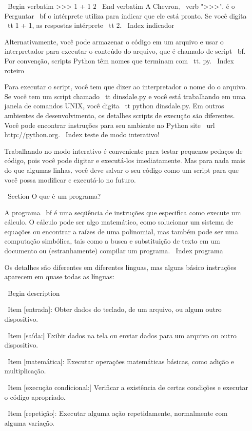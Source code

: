 \documentclass[10pt]{book}
\begin{document}
\begin {itemize}
{\ Begin {verbatim}
>>> 1 + 1
2
\ End {verbatim}
%
A Chevron, \ verb ">>>", é o
{Perguntar \ bf} o intérprete utiliza para indicar que ele está pronto. Se
você digita {\ tt 1 + 1}, as respostas intérprete {\ tt 2}.
\ Index {indicador}

Alternativamente, você pode armazenar o código em um arquivo e usar o interpretador para
executar o conteúdo do arquivo, que é chamado de {script \ bf}. Por
convenção, scripts Python têm nomes que terminam com {\ tt. py}.
\ Index {} roteiro

Para executar o script, você tem que dizer ao interpretador o nome do
o arquivo. Se você tem um script chamado {\ tt dinsdale.py} e você está
trabalhando em uma janela de comandos UNIX, você digita {\ tt python
dinsdale.py}. Em outros ambientes de desenvolvimento, os detalhes
scripts de execução são diferentes. Você pode encontrar instruções para
seu ambiente no Python site \ url {http://python.org}.
\ Index {teste de modo interativo!}

Trabalhando no modo interativo é conveniente para testar pequenos pedaços de
código, pois você pode digitar e executá-los imediatamente. Mas para
nada mais do que algumas linhas, você deve salvar o seu código
como um script para que você possa modificar e executá-lo no futuro.


\ Section {O que é um programa?}

A {programa \ bf} é uma seqüência de instruções que especifica como
execute um cálculo. O cálculo pode ser algo
matemático, como solucionar um sistema de equações ou encontrar a
raízes de uma polinomial, mas também pode ser uma computação simbólica, tais
como a busca e substituição de texto em um documento ou (estranhamente)
compilar um programa.
\ Index {programa}

Os detalhes são diferentes em diferentes línguas, mas alguns básico
instruções aparecem em quase todas as línguas:

\ Begin {description}

\ Item [entrada]: Obter dados do teclado, de um arquivo, ou algum
outro dispositivo.

\ Item [saída:] Exibir dados na tela ou enviar dados para um
arquivo ou outro dispositivo.

\ Item [matemática]: Executar operações matemáticas básicas, como adição e
multiplicação.

\ Item [execução condicional:] Verificar a existência de certas condições e
executar o código apropriado.

\ Item [repetição]: Executar alguma ação repetidamente, normalmente com
alguma variação.

}
\end{itemize}
\end{document}
